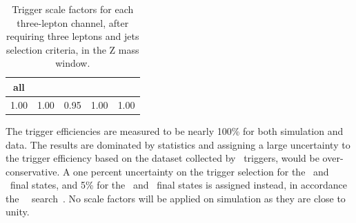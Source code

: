 \begin{table}[htbp]
	\centering
	\caption{Trigger scale factors for each three-lepton channel, after requiring three leptons and jets selection criteria, in the Z mass window.}
	\begin{tabular}{ccccc}
		\toprule 
		all & \mumumu & \eee & \eemu & \emumu \\ 
		\midrule 
		1.00 & 1.00 & 0.95 & 1.00  & 1.00 \\ 
		\bottomrule
	\end{tabular} 
	\label{tab:trigSFe}
\end{table}

%	
The trigger efficiencies are measured to be nearly 100\% for both simulation and data. The results are dominated by statistics and assigning a large uncertainty to the trigger efficiency based on the dataset collected by \Etmis\ triggers, would be over-conservative. A one percent uncertainty on the trigger selection for the \eemu\ and \mumumu\ final states, and 5\% for the \eee\ and \emumu\ final states is assigned instead, in accordance the \SM\ \tZq\ search~\cite{CMS-PAS-TOP-16-020}. No scale factors will be applied on simulation as they are close to unity. %

